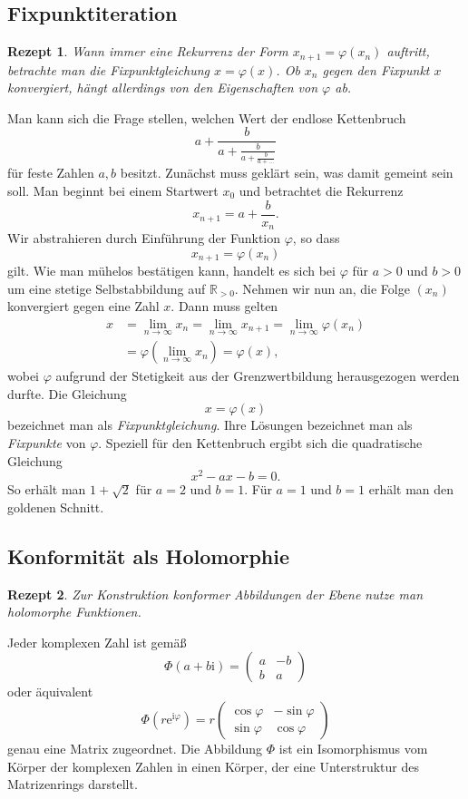\documentclass[a4paper,10pt,fleqn,twocolumn,twoside,dvipdfmx]{scrartcl}
\theoremstyle{rmbox}
\newtheorem{Rezept}{Rezept}[section]
\newcommand{\ee}{\mathrm{e}}
\newcommand{\ui}{\mathrm{i}}
\newcommand{\R}{\mathbb R}
\begin{document}
\newpage
\subsection{Fixpunktiteration}

\begin{Rezept}
Wann immer eine Rekurrenz der Form $x_{n+1} = \varphi(x_n)$
auftritt, betrachte man die Fixpunktgleichung $x = \varphi(x)$. Ob
$x_n$ gegen den Fixpunkt $x$ konvergiert, hängt allerdings von den
Eigenschaften von $\varphi$ ab.
\end{Rezept}

\noindent
Man kann sich die Frage stellen, welchen Wert der endlose
Kettenbruch
\[a+\frac{b}{a+\frac{b}{a+\frac{b}{a+\ldots}}}\]
für feste Zahlen $a,b$ besitzt. Zunächst muss geklärt sein, was
damit gemeint sein soll. Man beginnt bei einem Startwert $x_0$
und betrachtet die Rekurrenz
\[x_{n+1} = a+\frac{b}{x_n}.\]
Wir abstrahieren durch Einführung der Funktion $\varphi$, so dass
\[x_{n+1} = \varphi(x_n)\]
gilt. Wie man mühelos bestätigen kann, handelt es sich bei $\varphi$
für $a>0$ und $b>0$ um eine stetige Selbstabbildung auf $\R_{>0}$.
Nehmen wir nun an, die Folge $(x_n)$ konvergiert gegen eine Zahl $x$.
Dann muss gelten
\begin{align*}
x &= \lim_{n\to\infty} x_{n} = \lim_{n\to\infty} x_{n+1}
= \lim_{n\to\infty}\varphi(x_n)\\
&= \varphi(\lim_{n\to\infty} x_n) = \varphi(x),
\end{align*}
wobei $\varphi$ aufgrund der Stetigkeit aus der Grenzwertbildung
herausgezogen werden durfte. Die Gleichung
\[x = \varphi(x)\]
bezeichnet man als \emph{Fixpunktgleichung}. Ihre Lösungen
bezeichnet man als \emph{Fixpunkte} von $\varphi$. Speziell für den
Kettenbruch ergibt sich die quadratische Gleichung
\[x^2 - ax - b = 0.\]
So erhält man $1+\sqrt{2}$ für $a=2$ und $b=1$.
Für $a=1$ und $b=1$ erhält man den goldenen Schnitt.


\subsection{Konformität als Holomorphie}

\begin{Rezept}
Zur Konstruktion konformer Abbildungen der Ebene
nutze man holomorphe Funktionen.
\end{Rezept}

\noindent
Jeder komplexen Zahl ist gemäß
\[\Phi(a+b\ui) = \begin{pmatrix}a & -b\\ b & a\end{pmatrix}\]
oder äquivalent
\[\Phi(r\ee^{\ui\varphi}) = r\begin{pmatrix}
\cos\varphi & -\sin\varphi\\
\sin\varphi & \cos\varphi
\end{pmatrix}\]
genau eine Matrix zugeordnet. Die Abbildung $\Phi$ ist ein
Isomorphismus vom Körper der komplexen Zahlen in einen Körper,
der eine Unterstruktur des Matrizenrings darstellt.
\end{document}
